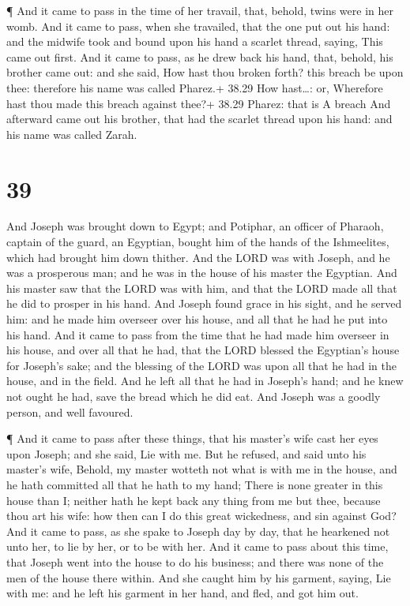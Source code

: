  ¶ And it came to pass in the time of her travail, that,
behold, twins were in her womb.  And it came to pass, when
she travailed, that the one put out his hand: and the midwife took and
bound upon his hand a scarlet thread, saying, This came out first.
 And it came to pass, as he drew back his hand, that,
behold, his brother came out: and she said, How hast thou broken forth?
this breach be upon thee: therefore his name was called Pharez.+ 38.29
How hast\ldots: or, Wherefore hast thou made this breach against thee?+
38.29 Pharez: that is A breach  And afterward came out his
brother, that had the scarlet thread upon his hand: and his name was
called Zarah.

\hypertarget{section-38}{%
\section{39}\label{section-38}}

 And Joseph was brought down to Egypt; and Potiphar, an
officer of Pharaoh, captain of the guard, an Egyptian, bought him of the
hands of the Ishmeelites, which had brought him down thither.
 And the LORD was with Joseph, and he was a prosperous man;
and he was in the house of his master the Egyptian.  And his
master saw that the LORD was with him, and that the LORD made all that
he did to prosper in his hand.  And Joseph found grace in
his sight, and he served him: and he made him overseer over his house,
and all that he had he put into his hand.  And it came to
pass from the time that he had made him overseer in his house, and over
all that he had, that the LORD blessed the Egyptian's house for Joseph's
sake; and the blessing of the LORD was upon all that he had in the
house, and in the field.  And he left all that he had in
Joseph's hand; and he knew not ought he had, save the bread which he did
eat. And Joseph was a goodly person, and well favoured.

 ¶ And it came to pass after these things, that his master's
wife cast her eyes upon Joseph; and she said, Lie with me. 
But he refused, and said unto his master's wife, Behold, my master
wotteth not what is with me in the house, and he hath committed all that
he hath to my hand;  There is none greater in this house
than I; neither hath he kept back any thing from me but thee, because
thou art his wife: how then can I do this great wickedness, and sin
against God?  And it came to pass, as she spake to Joseph
day by day, that he hearkened not unto her, to lie by her, or to be with
her.  And it came to pass about this time, that Joseph went
into the house to do his business; and there was none of the men of the
house there within.  And she caught him by his garment,
saying, Lie with me: and he left his garment in her hand, and fled, and
got him out.

